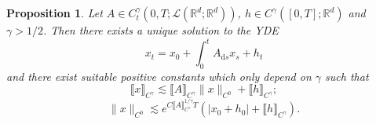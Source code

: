 \documentclass[10pt]{article}
\newcommand{\mathd}{\mathrm{d}}
\newtheorem{proposition}{Proposition}
{\theorembodyfont{\rmfamily}\newtheorem{remark}{Remark}}
\begin{document}
\begin{proposition}
  \label{appendixA1 lemma bound linear YDE}Let $A \in C^{\gamma}_t (0, T ;
  \mathcal{L} (\mathbb{R}^d ; \mathbb{R}^d))$, $h \in C^{\gamma} ([0, T] ;
  \mathbb{R}^d)$ and $\gamma > 1 / 2$. Then there exists a unique solution to
  the YDE
  \begin{equation}
    x_t = x_0 + \int_0^t A_{\mathd s} x_s + h_t \label{appendixA1 linear YDE}
  \end{equation}
  and there exist suitable positive constants which only depend on $\gamma$
  such that
  \begin{equation}
    \llbracket x \rrbracket_{C^{\gamma}} \lesssim \llbracket A
    \rrbracket_{C^{\gamma}} \| x \|_{C^0} + \llbracket h
    \rrbracket_{C^{\gamma}} ; \label{appendixA1 bound linear YDE}
  \end{equation}
  \begin{equation}
    \| x \|_{C^0} \lesssim e^{C \llbracket A \rrbracket_{C^{\gamma}}^{1 /
    \gamma} T}  (| x_0 + h_0 | + \llbracket h \rrbracket_{C^{\gamma}}) .
    \label{appendixA1 bound2 linear YDE}
  \end{equation}
\end{proposition}
\end{document}
